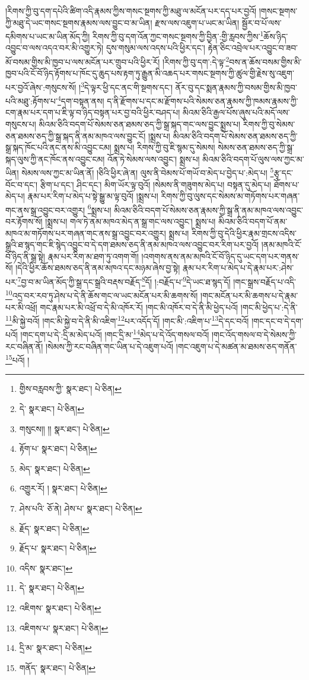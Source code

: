 །རིགས་ཀྱི་བུ་དག་དཔེའི་ཚིག་འདི་རྣམས་ཀྱིས་གསང་སྔགས་ཀྱི་མཐུ་ལ་མངོན་པར་དད་པར་བྱའོ། །གསང་སྔགས་ཀྱི་མཐུ་དེ་ཡང་གསང་སྔགས་རྣམས་ལས་བྱུང་བ་མ་ཡིན། རྫས་ལས་འཇུག་པ་ཡང་མ་ཡིན། སྦྱོར་བ་པོ་ལས་དམིགས་པ་ཡང་མ་ཡིན་མོད་ཀྱི། རིགས་ཀྱི་བུ་དག་འོན་ཀྱང་གསང་སྔགས་ཀྱི་བྱིན་:གྱི་རླབས་ཀྱིས་\footnote{གྱིས་བརླབས་ཀྱི་  སྣར་ཐང་།  པེ་ཅིན། }ཆོས་ཉིད་འབྱུང་བ་ལས་འདའ་བར་མི་འགྱུར་ཏེ། དུས་གསུམ་ལས་འདས་པའི་ཕྱིར་དང་། རྟེན་ཅིང་འབྲེལ་པར་འབྱུང་བ་ཟབ་མོ་བསམ་གྱིས་མི་ཁྱབ་པ་ལས་མངོན་པར་གྲུབ་པའི་ཕྱིར་རོ། །རིགས་ཀྱི་བུ་དག་:དེ་ལྟ་\footnote{དེ་  སྣར་ཐང་།  པེ་ཅིན། }བས་ན་ཆོས་བསམ་གྱིས་མི་ཁྱབ་པའི་ངོ་བོ་ཉིད་རྟོགས་པ་ཁོང་དུ་ཆུད་པས་རྟག་ཏུ་རྒྱུན་མི་འཆད་པར་གསང་སྔགས་ཀྱི་ཚུལ་གྱི་རྗེས་སུ་འཇུག་པར་བྱའོ་ཞེས་:གསུངས་སོ། །\footnote{གསུངས།། །།  སྣར་ཐང་།  པེ་ཅིན། }དེ་ལྟར་ཕྱི་དང་ནང་གི་སྔགས་དང་། ནོར་བུ་དང་སྨན་རྣམས་ཀྱི་བསམ་གྱིས་མི་ཁྱབ་པའི་མཐུ་:རྟོགས་པ་\footnote{རྟོག་པ་  སྣར་ཐང་།  པེ་ཅིན། }དག་བསྟན་ནས། ད་ནི་རྫོགས་པ་དང་མ་རྫོགས་པའི་སེམས་ཅན་རྣམས་ཀྱི་ཁམས་རྣམས་ཀྱི་ངག་རྣམ་པར་དག་པ་ཇི་ལྟ་བ་ཉིད་བསྟན་པར་བྱ་བའི་ཕྱིར་བཤད་པ། མིའམ་ཅིའི་རྒྱལ་པོས་ཞུས་པའི་མདོ་ལས་གསུངས་པ། མིའམ་ཅིའི་བདག་པོ་སེམས་ཅན་ཐམས་ཅད་ཀྱི་སྒྲ་སྐད་གང་ལས་བྱུང་སྨྲས་པ། རིགས་ཀྱི་བུ་སེམས་ཅན་ཐམས་ཅད་ཀྱི་སྒྲ་སྐད་ནི་ནམ་མཁའ་ལས་བྱུང་ངོ། །སྨྲས་པ། མིའམ་ཅིའི་བདག་པོ་སེམས་ཅན་ཐམས་ཅད་ཀྱི་སྒྲ་སྐད་ཁོང་པའི་ནང་ནས་མི་འབྱུང་ངམ། སྨྲས་པ། རིགས་ཀྱི་བུ་ཇི་སྙམ་དུ་སེམས། སེམས་ཅན་ཐམས་ཅད་ཀྱི་སྒྲ་སྐད་ལུས་ཀྱི་ནང་ཁོང་ནས་འབྱུང་ངམ། འོན་ཏེ་སེམས་ལས་འབྱུང་། སྨྲས་པ། མིའམ་ཅིའི་བདག་པོ་ལུས་ལས་ཀྱང་མ་ཡིན། སེམས་ལས་ཀྱང་མ་ཡིན་ནོ། །ཅིའི་ཕྱིར་ཞེ་ན། ལུས་ནི་བེམས་པོ་གཡོ་བ་མེད་པ་བྱེད་པ་:མེད་པ། \footnote{མེད་  སྣར་ཐང་།  པེ་ཅིན། }རྩྭ་དང་བོང་བ་དང་། རྩིག་པ་དང་། ཤིང་དང་། མིག་ཡོར་ལྟ་བུའོ། །སེམས་ནི་གཟུགས་མེད་པ། བསྟན་དུ་མེད་པ། ཐོགས་པ་མེད་པ། རྣམ་པར་རིག་པ་མེད་པ་སྟེ་སྒྱུ་མ་ལྟ་བུའོ། །སྨྲས་པ། རིགས་ཀྱི་བུ་ལུས་དང་སེམས་མ་གཏོགས་པར་གཞན་གང་ནས་སྒྲ་འབྱུང་བར་འགྱུར། \footnote{འགྱུར་རོ། །   སྣར་ཐང་།  པེ་ཅིན། }སྨྲས་པ། མིའམ་ཅིའི་བདག་པོ་སེམས་ཅན་རྣམས་ཀྱི་སྒྲ་ནི་ནམ་མཁའ་ལས་འབྱུང་བར་རྟོགས་སོ། །སྨྲས་པ། གལ་ཏེ་ནམ་མཁའ་མེད་ན་སྒྲ་གང་ལས་འབྱུང་། སྨྲས་པ། མིའམ་ཅིའི་བདག་པོ་ནམ་མཁའ་མ་གཏོགས་པར་གཞན་གང་ནས་སྒྲ་འབྱུང་བར་འགྱུར། སྨྲས་པ། རིགས་ཀྱི་བུ་དེའི་ཕྱིར་རྣམ་གྲངས་འདིས་སྒྲའི་ཐ་སྙད་གང་ཇི་སྙེད་འབྱུང་བ་དེ་དག་ཐམས་ཅད་ནི་ནམ་མཁའ་ལས་འབྱུང་བར་རིག་པར་བྱའོ། །ནམ་མཁའི་ངོ་བོ་ཉིད་ནི་སྒྲ་སྟེ། རྣམ་པར་རིག་མ་ཐག་ཏུ་འགག་གོ། །འགགས་ནས་ནམ་མཁའི་ངོ་བོ་ཉིད་དུ་ཡང་དག་པར་གནས་སོ། །དེའི་ཕྱིར་ཆོས་ཐམས་ཅད་ནི་ནམ་མཁའ་དང་མཉམ་ཞེས་བྱ་སྟེ། རྣམ་པར་རིག་པ་མེད་པ་དེ་རྣམ་པར་:ཤེས་པར་\footnote{ཤེས་པའི་  ཅོ་ནེ། ཤེས་པ་  སྣར་ཐང་།  པེ་ཅིན། }བྱ་བ་མ་ཡིན་མོད་ཀྱི་སྒྲ་དང་སྒྲའི་བརྡས་བརྗོད་\footnote{རྗོད་  སྣར་ཐང་།  པེ་ཅིན། }དོ། །:བརྗོད་པ་\footnote{རྗོད་པ་  སྣར་ཐང་།  པེ་ཅིན། }དེ་ཡང་ཐ་སྙད་དོ། །གང་སྒྲས་བརྗོད་པ་འདི་\footnote{འདིས་  སྣར་ཐང་། }འདྲ་བར་རབ་ཏུ་ཤེས་པ་དེ་ནི་ཆོས་གང་ལ་ཡང་མངོན་པར་མི་ཆགས་སོ། །གང་མངོན་པར་མི་ཆགས་པ་དེ་རྣམ་པར་མི་འཕྲོ། གང་རྣམ་པར་མི་འཕྲོ་བ་དེ་མི་འཁོར་རོ། །གང་མི་འཁོར་བ་དེ་ནི་མི་ཕྱེད་པའོ། །གང་མི་ཕྱེད་པ་:དེ་ནི་\footnote{དེ་  སྣར་ཐང་།  པེ་ཅིན། }མི་སྐྱེ་བའོ། །གང་མི་སྐྱེ་བ་དེ་ནི་མི་འཇིག་\footnote{འཇིགས་  སྣར་ཐང་།  པེ་ཅིན། }པར་འདོད་དོ། །གང་མི་:འཇིག་པ་\footnote{འཇིགས་པ་  སྣར་ཐང་།  པེ་ཅིན། }དེ་དང་བའོ། །གང་དང་བ་དེ་དག་པའོ། །གང་དག་པ་དེ་:དྲི་མ་མེད་པའོ། །གང་དྲི་མ་\footnote{དྲི་མ་  སྣར་ཐང་།  པེ་ཅིན། }མེད་པ་དེ་འོད་གསལ་བའོ། །གང་འོད་གསལ་བ་དེ་སེམས་ཀྱི་རང་བཞིན་ནོ། །སེམས་ཀྱི་རང་བཞིན་གང་ཡིན་པ་དེ་འཇུག་པའོ། །གང་འཇུག་པ་དེ་མཚན་མ་ཐམས་ཅད་གནོན་\footnote{གནོད་  སྣར་ཐང་།  པེ་ཅིན། }པའོ། །
